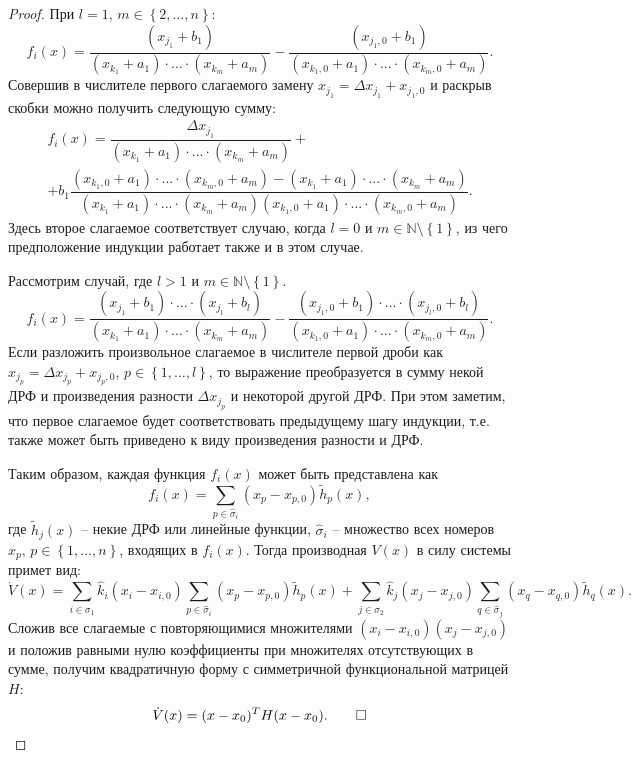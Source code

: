 \documentclass[14pt,a4paper]{extarticle}
\begin{document}
\begin{proof}
		При $l=1$, $m\in\left\{2,\dots,n\right\}$:
		\[f_i(x)=\dfrac{(x_{j_1}+b_1)}{(x_{k_1}+a_1)\cdot...\cdot(x_{k_m}+a_m)}-\dfrac{(x_{j_1,0}+b_1)}{(x_{k_1,0}+a_1)\cdot...\cdot(x_{k_m,0}+a_m)}.\]
		Совершив в числителе первого слагаемого замену $x_{j_1}=\Delta x_{j_1} + x_{j_1,0}$ и раскрыв скобки можно получить следующую сумму:
		\begin{multline*}
			f_i(x)=\dfrac{\Delta x_{j_1}}{(x_{k_1}+a_1)\cdot...\cdot(x_{k_m}+a_m)}+\\
			+b_1\dfrac{(x_{k_1,0}+a_1)\cdot...\cdot(x_{k_m,0}+a_m)-(x_{k_1}+a_1)\cdot...\cdot(x_{k_m}+a_m)}{(x_{k_1}+a_1)\cdot...\cdot(x_{k_m}+a_m)(x_{k_1,0}+a_1)\cdot...\cdot(x_{k_m,0}+a_m)}.
		\end{multline*}
		Здесь второе слагаемое соответствует случаю, когда $l=0$ и $m\in\mathbb{N}\setminus\left\{1\right\}$, из чего предположение индукции работает также и в этом случае. 
		
		Рассмотрим случай, где $l > 1$ и $m\in\mathbb{N}\setminus\left\{1\right\}$.
		\[f_i(x)=\dfrac{(x_{j_1}+b_1)\cdot...\cdot(x_{j_l}+b_l)}{(x_{k_1}+a_1)\cdot...\cdot(x_{k_m}+a_m)}-\dfrac{(x_{j_1,0}+b_1)\cdot...\cdot(x_{j_l,0}+b_l)}{(x_{k_1,0}+a_1)\cdot...\cdot(x_{k_m,0}+a_m)}.\]
		Если разложить произвольное слагаемое в числителе первой дроби как $x_{j_p}=\Delta x_{j_p} + x_{j_p,0},\, p\in\left\{1,\dots,l\right\}$, то выражение преобразуется в сумму некой ДРФ и произведения разности $\Delta x_{j_p}$ и некоторой другой ДРФ. При этом заметим, что первое слагаемое будет соответствовать предыдущему шагу индукции, т.е. также может быть приведено к виду произведения разности и ДРФ.
		
		Таким образом, каждая функция $f_i(x)$ может быть представлена как
		\[f_i(x)=\sum\limits_{p\in\hat{\sigma}_i}(x_p-x_{p,0})\tilde{h}_p(x),\]    
		где $\tilde{h}_j(x)$ -- некие ДРФ или линейные функции, $\hat{\sigma}_i$ -- множество всех номеров $x_p,\, p\in\left\{1,\dots,n\right\}$, входящих в $f_i(x)$. Тогда производная $V(x)$ в силу системы примет вид:
		\[\dot{V}(x)=\sum\limits_{i\in\sigma_1}\hat{k}_i(x_i-x_{i,0})\sum\limits_{p\in\hat{\sigma}_i}(x_p-x_{p,0})\tilde{h}_{p}(x)+\sum\limits_{j\in\sigma_2}\hat{k}_j(x_j-x_{j,0})\sum\limits_{q\in\hat{\sigma}_j}(x_q-x_{q,0})\tilde{h}_{q}(x).\]
		Сложив все слагаемые с повторяющимися множителями $(x_i-x_{i,0})(x_j-x_{j,0})$ и положив равными нулю коэффициенты при множителях отсутствующих в сумме, получим квадратичную форму с симметричной функциональной матрицей $H$:
		\[\dot{V}(x)=(x-x_0)^{T}H(x-x_0).\qed\]
	\end{proof}
	
\end{document}
